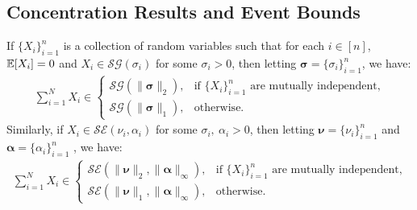 \subsection{Concentration Results and Event Bounds}
\label{app:concentration}

\begin{lemma}\label{lemma:sum-sub-gaussian}
If $\{X_i\}_{i=1}^n$ is a collection of random variables such that for each $i \in [n]$, $\mathbb{E}[X_i] = 0$ and $X_i \in \mathcal{SG}(\sigma_i)$ for some $\sigma_i > 0$, then letting $\boldsymbol{\sigma} = \{\sigma_i\}_{i=1}^n$, we have:
\begin{align*}
    \sum_{i=1}^N X_i \in 
    \begin{cases}
        \mathcal{SG}(\lVert \boldsymbol{\sigma}\rVert_2), &\text{if $\{X_i\}_{i=1}^n$ are mutually independent,} \\
        \mathcal{SG}(\lVert \boldsymbol{\sigma}\rVert_1), &\text{otherwise.}
    \end{cases}
\end{align*}
Similarly, if $X_i \in \mathcal{SE}(\nu_i, \alpha_i)$ for some $\sigma_i,\:\alpha_i > 0$, then letting $\boldsymbol{\nu} = \{\nu_i\}_{i=1}^n$ and $\boldsymbol{\alpha} = \{\alpha_i\}_{i=1}^n$ , we have:
\begin{align*}
    \sum_{i=1}^N X_i \in 
    \begin{cases}
        \mathcal{SE}(\lVert \boldsymbol{\nu}\rVert_2, \lVert \boldsymbol{\alpha}\rVert_\infty), &\text{if $\{X_i\}_{i=1}^n$ are mutually independent,} \\
        \mathcal{SE}(\lVert \boldsymbol{\nu}\rVert_1,  \lVert \boldsymbol{\alpha}\rVert_\infty), &\text{otherwise.}
    \end{cases}
\end{align*}
\end{lemma}

